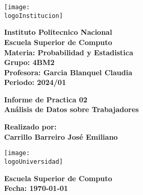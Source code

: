\documentclass{article}
\newcommand{\logoInstitucion}{logotipo_ipn.png} %
\newcommand{\logoUniversidad}{EscudoESCOM.png} %
\newcommand{\nombreInstituto}{Instituto Politecnico Nacional}
\newcommand{\facultad}{Escuela Superior de Computo}
\newcommand{\materia}{Probabilidad y Estadistica}
\newcommand{\grupo}{4BM2}
\newcommand{\profesora}{Garcia Blanquel Claudia}
\newcommand{\periodo}{2024/01}
\newcommand{\alumno}{Carrillo Barreiro José Emiliano}
\begin{document}
\begin{titlepage}
    \begin{center}
        \vspace*{1cm}

        \texttt{[image: \\logoInstitucion]}

        \vspace{1.5cm}

        \textbf{\LARGE \nombreInstituto} \\
        \textbf{\Large \facultad} \\
        \vspace{0.5cm}
        \textbf{\large Materia: \materia} \\
        \textbf{\large Grupo: \grupo} \\
        \vspace{0.5cm}
        \textbf{\large Profesora: \profesora} \\
        \textbf{\large Periodo: \periodo} \\

        \vspace{2cm}

        \textbf{\LARGE Informe de Practica 02} \\
        \vspace{0.5cm}
        \textbf{\Large Análisis de Datos sobre Trabajadores} \\

        \vfill

        \textbf{\large Realizado por:} \\
        \textbf{\large \alumno}

        \vspace{1cm}

        \texttt{[image: \\logoUniversidad]}

        \vspace{1cm}

        \textbf{\large \facultad} \\
        \textbf{\large Fecha: \today}

    \end{center}
\end{titlepage}

\tableofcontents
\newpage

\end{document}
